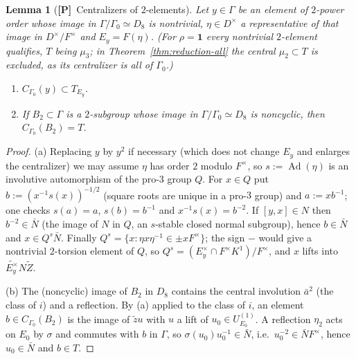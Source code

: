 \documentclass[11pt]{article}
\newcommand{\Ad}{\operatorname{Ad}}
\newcommand{\tZ}{\widetilde Z}
\newcommand{\Ptag}{\textnormal{\textbf{[P]}}}
\theoremstyle{plain}
\newtheorem{lemma}[theorem]{Lemma}
\theoremstyle{definition}
\begin{document}
\begin{lemma}[\Ptag\ Centralizers of $2$-elements]\label{lem:centralizers}
Let $y\in\Gamma$ be an element of $2$-power order whose image in
$\Gamma/\Gamma_0\simeq D_8$ is nontrivial, $\eta\in D^\times$ a
representative of that image in $D^\times/F^\times$ and $E_y=F(\eta)$.
(For $\rho=\mathbf1$ every nontrivial $2$-element qualifies, $T$ being
$\mu_3$; in Theorem~\ref{thm:reduction-all} the central $\mu_2\subset T$
is excluded, as its centralizer is all of $\Gamma_0$.)
\begin{enumerate}[label=(\alph*)]
\item $C_{\Gamma_0}(y)\subset T_{E_y}$.
\item If $B_2\subset\Gamma$ is a $2$-subgroup whose image in
$\Gamma/\Gamma_0\simeq D_8$ is noncyclic, then $C_{\Gamma_0}(B_2)=T$.
\end{enumerate}
\end{lemma}
\begin{proof}
(a) Replacing $y$ by $y^2$ if necessary (which does not change $E_y$ and
enlarges the centralizer) we may assume $\eta$ has order $2$ modulo
$F^\times$, so $s:=\Ad(\eta)$ is an involutive automorphism of the
pro-$3$ group $Q$.  For $x\in Q$ put $b:=(x^{-1}s(x))^{-1/2}$ (square
roots are unique in a pro-$3$ group) and $a:=xb^{-1}$; one checks
$s(a)=a$, $s(b)=b^{-1}$ and $x^{-1}s(x)=b^{-2}$.  If
$[y,x]\in N$ then $b^{-2}\in\bar N$ (the image of $N$ in $Q$, an
$s$-stable closed normal subgroup), hence $b\in\bar N$ and
$x\in Q^s\bar N$.  Finally $Q^s=\{x:\eta x\eta^{-1}\in\pm xF^\times\}$;
the sign $-$ would give a nontrivial $2$-torsion element of $Q$, so
$Q^s=(E_y^\times\cap F^\times K^1)/F^\times$, and $x$ lifts into
$\widetilde{E_y^\times}N\tZ$.

(b) The (noncyclic) image of $B_2$ in $D_8$ contains the central involution
$\bar a^2$ (the class of $i$) and a reflection.  By (a) applied to the
class of $i$, an element $b\in C_{\Gamma_0}(B_2)$ is the image of
$\tilde zu$ with $u$ a lift of $u_0\in U^{(1)}_{E_0}$.  A reflection $\eta_2$
acts on $E_0$ by $\sigma$ and commutes with $b$ in $\Gamma$, so
$\sigma(u_0)u_0^{-1}\in\bar N$, i.e.\ $u_0^{-2}\in\bar N F^\times$,
hence $u_0\in\bar N$ and $b\in T$.
\end{proof}
\end{document}

